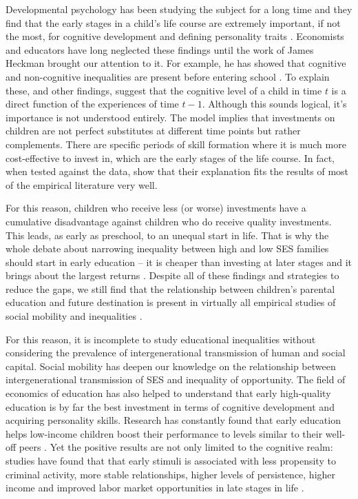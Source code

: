 \documentclass[11pt, a4paper]{article}\usepackage[]{graphicx}\usepackage[]{color}
\begin{document}
Developmental psychology has been studying the subject for a long time and they find that the early stages in a child's life course are extremely important, if not the most, for cognitive development and defining personality traits \citep{duyme1999, waldfogel2006}. Economists and educators have long neglected these findings until the work of James Heckman brought our attention to it. For example, he has showed that cognitive and non-cognitive inequalities are present before entering school \citep{heckman2006}. To explain these, and other findings, \citet{cunha2006} suggest that the cognitive level of a child in time \(t\) is a direct function of the experiences of time \(t-1\). Although this sounds logical, it's importance is not understood entirely. The model implies that investments on children are not perfect substitutes at different time points but rather complements. There are specific periods of skill formation where it is much more cost-effective to invest in, which are the early stages of the life course. In fact, when tested against the data, \citet{cunha2006} show that their explanation fits the results of most of the empirical literature very well.

For this reason, children who receive less (or worse) investments have a cumulative disadvantage against children who do receive quality investments. This leads, as early as preschool, to an unequal start in life. That is why the whole debate about narrowing inequality between high and low SES families should start in early education -- it is cheaper than investing at later stages and it brings about the largest returns \citep{elango15}. Despite all of these findings and strategies to reduce the gaps, we still find that the relationship between children's parental education and future destination is present in virtually all empirical studies of social mobility and inequalities \citep{breen1997, breen2007, waldfogel2006, bradbury2015, chetty2016}.


For this reason, it is incomplete to study educational inequalities without considering the prevalence of intergenerational transmission of human and social capital. Social mobility has deepen our knowledge on the relationship between intergenerational transmission of SES and inequality of opportunity. The field of economics of education has also helped to understand that early high-quality education is by far the best investment in terms of cognitive development and acquiring personality skills. Research has constantly found that early education helps low-income children boost their performance to levels similar to their well-off peers \citep{heckman_oecd}. Yet the positive results are not only limited to the cognitive realm: studies have found that that early stimuli is associated with less propensity to criminal activity, more stable relationships, higher levels of persistence, higher income and improved labor market opportunities in late stages in life \citep{heckman_oecd}.
\end{document}
